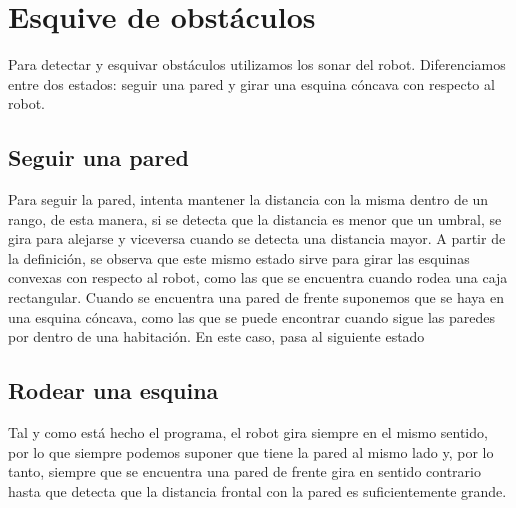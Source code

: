 \documentclass[11pt]{article}
\begin{document}
\section{Esquive de obstáculos}
\label{sec-2}
Para detectar y esquivar obstáculos utilizamos los sonar del robot. Diferenciamos entre dos estados:
seguir una pared y girar una esquina cóncava con respecto al robot.

\subsection{Seguir una pared}
\label{sec-2-1}
Para seguir la pared, intenta mantener la distancia con la misma dentro de un rango, de esta manera,
si se detecta que la distancia es menor que un umbral, se gira para alejarse y viceversa cuando se
detecta una distancia mayor. A partir de la definición, se observa que este mismo estado sirve para
girar las esquinas convexas con respecto al robot, como las que se encuentra cuando rodea una caja
rectangular. Cuando se encuentra una pared de frente suponemos que se haya en una esquina cóncava,
como las que se puede encontrar cuando sigue las paredes por dentro de una habitación. En este caso,
pasa al siguiente estado

\subsection{Rodear una esquina}
\label{sec-2-2}
Tal y como está hecho el programa, el robot gira siempre en el mismo sentido, por lo que siempre podemos
suponer que tiene la pared al mismo lado y, por lo tanto, siempre que se encuentra una pared de frente
gira en sentido contrario hasta que detecta que la distancia frontal con la pared es suficientemente grande.
\end{document}
